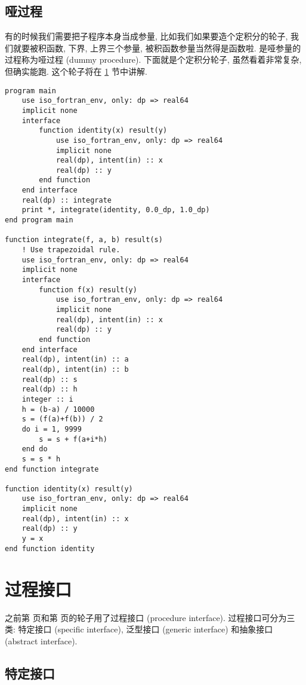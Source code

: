 \subsection{哑过程} 

有的时候我们需要把子程序本身当成参量, 比如我们如果要造个定积分的轮子, 我们就要被积函数, 下界, 上界三个参量, 被积函数参量当然得是函数啦. 是哑参量的过程称为哑过程 (dummy procedure). 下面就是个定积分轮子, 虽然看着非常复杂, 但确实能跑. 这个轮子将在 \ref{fortran_interface} 节中讲解. \label{dummy_procedure_program} 
\begin{lstlisting} 
program main
    use iso_fortran_env, only: dp => real64
    implicit none
    interface
        function identity(x) result(y)
            use iso_fortran_env, only: dp => real64
            implicit none
            real(dp), intent(in) :: x
            real(dp) :: y
        end function
    end interface
    real(dp) :: integrate
    print *, integrate(identity, 0.0_dp, 1.0_dp)
end program main

function integrate(f, a, b) result(s)
    ! Use trapezoidal rule.
    use iso_fortran_env, only: dp => real64
    implicit none
    interface
        function f(x) result(y)
            use iso_fortran_env, only: dp => real64
            implicit none
            real(dp), intent(in) :: x
            real(dp) :: y
        end function
    end interface
    real(dp), intent(in) :: a
    real(dp), intent(in) :: b
    real(dp) :: s
    real(dp) :: h
    integer :: i
    h = (b-a) / 10000
    s = (f(a)+f(b)) / 2
    do i = 1, 9999
        s = s + f(a+i*h)
    end do
    s = s * h
end function integrate

function identity(x) result(y)
    use iso_fortran_env, only: dp => real64
    implicit none
    real(dp), intent(in) :: x
    real(dp) :: y
    y = x
end function identity
\end{lstlisting} 

\section{过程接口} \label{fortran_interface} 

之前第 \pageref{assumed-shape_array_program} 页和第 \pageref{dummy_procedure_program} 页的轮子用了过程接口 (procedure interface). 过程接口可分为三类: 特定接口 (specific interface), 泛型接口 (generic interface) 和抽象接口 (abstract interface). 

\subsection{特定接口} 

